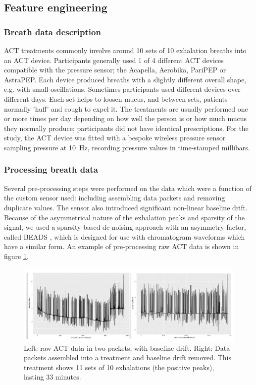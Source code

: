 \documentclass{article}
\begin{document}
\subsection{Feature engineering}

\subsubsection{Breath data description}

ACT treatments commonly involve around 10 sets of 10 exhalation breaths into an ACT device. Participants generally used 1 of 4 different ACT devices compatible with the pressure sensor; the Acapella, Aerobika, PariPEP or AstraPEP. Each device produced breaths with a slightly different overall shape, e.g. with small oscillations. Sometimes participants used different devices over different days. Each set helps to loosen mucus, and between sets, patients normally 'huff' and cough to expel it. The treatments are usually performed one or more times per day depending on how well the person is or how much mucus they normally produce; participants did not have identical prescriptions. For the study, the ACT device was fitted with a bespoke wireless pressure sensor sampling pressure at 10~Hz, recording pressure values in time-stamped millibars.  

\subsubsection{Processing breath data}

Several pre-processing steps were performed on the data which were a function of the custom sensor used: including assembling data packets and removing duplicate values. The sensor also introduced significant non-linear baseline drift. Because of the asymmetrical nature of the exhalation peaks and sparsity of the signal, we used a sparsity-based de-noising approach with an asymmetry factor, called BEADS \cite{Ning2014}, which is designed for use with chromatogram waveforms which have a similar form. An example of pre-processing raw ACT data is shown in figure \ref{fig:ACTpreprocessing}.

\begin{figure}[htb]
  \includegraphics[width=\textwidth]{ACTpreprocessing.png}
  \centering
   \caption{Left: raw ACT data in two packets, with baseline drift. Right: Data packets assembled into a treatment and baseline drift removed. This treatment shows 11 sets of 10 exhalations (the positive peaks), lasting 33 minutes.}
  \label{fig:ACTpreprocessing}
\end{figure}
\end{document}

